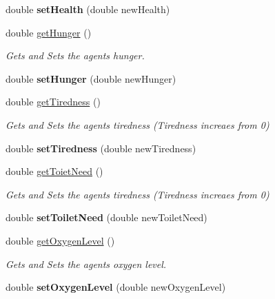 \begin{DoxyCompactItemize}
\mbox{\label{class_agent_abf38df47b1f8c4a183c655d80275cb20}} 
double {\bfseries set\+Health} (double new\+Health)
\item 
\mbox{\label{class_agent_a51b835d48e31e09698ecdceb721c3f23}} 
double \hyperlink{class_agent_a51b835d48e31e09698ecdceb721c3f23}{get\+Hunger} ()
\begin{DoxyCompactList}\small\item\em Gets and Sets the agents hunger. \end{DoxyCompactList}\item 
\mbox{\label{class_agent_a7f972fff138634c1b455e63db413c702}} 
double {\bfseries set\+Hunger} (double new\+Hunger)
\item 
\mbox{\label{class_agent_a5519977f67de721081136fe11efcd8c7}} 
double \hyperlink{class_agent_a5519977f67de721081136fe11efcd8c7}{get\+Tiredness} ()
\begin{DoxyCompactList}\small\item\em Gets and Sets the agents tiredness (Tiredness increaes from 0) \end{DoxyCompactList}\item 
\mbox{\label{class_agent_a4a8525ce42c08122282051efe077c791}} 
double {\bfseries set\+Tiredness} (double new\+Tiredness)
\item 
\mbox{\label{class_agent_aa6910d23593e6e7fbff838e60585e79c}} 
double \hyperlink{class_agent_aa6910d23593e6e7fbff838e60585e79c}{get\+Toiet\+Need} ()
\begin{DoxyCompactList}\small\item\em Gets and Sets the agents tiredness (Tiredness increaes from 0) \end{DoxyCompactList}\item 
\mbox{\label{class_agent_a0db1170e6cc50f37981a5ab305a181e0}} 
double {\bfseries set\+Toilet\+Need} (double new\+Toilet\+Need)
\item 
\mbox{\label{class_agent_a9abbdf8d3a9e2116faddce591865164b}} 
double \hyperlink{class_agent_a9abbdf8d3a9e2116faddce591865164b}{get\+Oxygen\+Level} ()
\begin{DoxyCompactList}\small\item\em Gets and Sets the agents oxygen level. \end{DoxyCompactList}\item 
\mbox{\label{class_agent_a58c4462e557ee00c45b3a8a8186980ee}} 
double {\bfseries set\+Oxygen\+Level} (double new\+Oxygen\+Level)
\end{DoxyCompactItemize}

